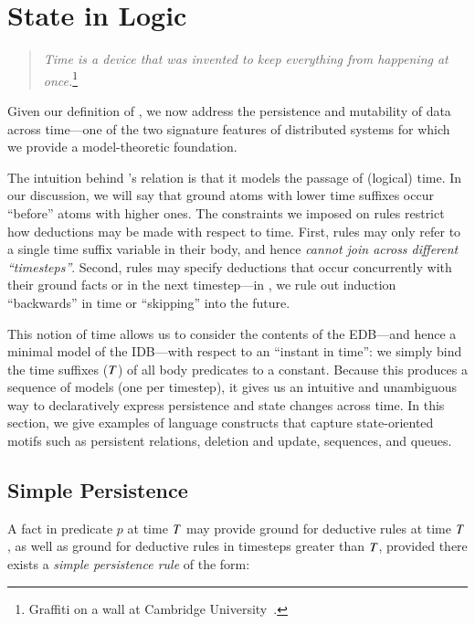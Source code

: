 \section{State in Logic}
\label{sec:stateupdate}


\begin{quote}
%
\emph{Time is a device that was invented to keep everything from
happening at once.}\footnote{Graffiti on a wall at Cambridge
University~\cite{scheme}.}
%
\end{quote} 

Given our definition of \slang, we now address the persistence and mutability
of data across time---one of the two signature features of distributed systems
for which we provide a model-theoretic foundation.

The intuition behind \slang's  relation is that it models the
passage of (logical) time.  In our discussion, we will say that ground atoms
with lower time suffixes occur ``before'' atoms with higher ones.
The constraints we imposed on \slang rules restrict how deductions may be made
with respect to time.  First, rules may only refer to a single time suffix variable in
their body, and hence {\em cannot join across different ``timesteps''}.  Second, rules may specify
deductions that occur concurrently with their ground facts or in the next
timestep---in \slang, we rule out induction ``backwards'' in time or
``skipping'' into the future.

This notion of time allows us to consider the contents of the EDB---and hence
a minimal model of the IDB---with respect to an ``instant in time'': we simply
bind the time suffixes ($\DT$) of all body predicates to a constant.  Because
this produces a sequence of models (one per timestep), it gives us an intuitive
and unambiguous way to declaratively express persistence and state changes
across time.  In this section, we give examples of language constructs
that capture state-oriented motifs such as persistent relations,
deletion and update, sequences, and queues.

\subsection{Simple Persistence}
A fact in predicate $p$ at time $\DT$ may provide ground for deductive rules
at time $\DT$, as well as ground for deductive rules in timesteps greater than $\DT$,
provided there exists a {\em simple persistence rule} of the form:

